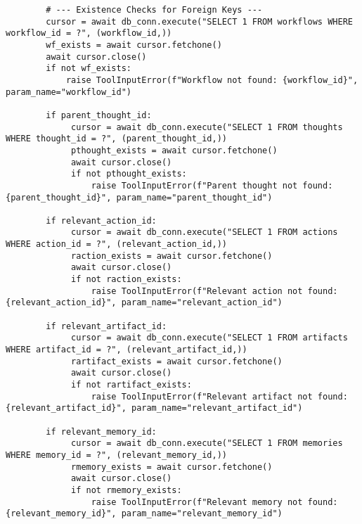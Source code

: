 \documentclass[12pt,a4paper]{article}
\begin{document}
\begin{pageablecode}
\begin{verbatim}
        # --- Existence Checks for Foreign Keys ---
        cursor = await db_conn.execute("SELECT 1 FROM workflows WHERE workflow_id = ?", (workflow_id,))
        wf_exists = await cursor.fetchone()
        await cursor.close()
        if not wf_exists:
            raise ToolInputError(f"Workflow not found: {workflow_id}", param_name="workflow_id")

        if parent_thought_id:
             cursor = await db_conn.execute("SELECT 1 FROM thoughts WHERE thought_id = ?", (parent_thought_id,))
             pthought_exists = await cursor.fetchone()
             await cursor.close()
             if not pthought_exists:
                 raise ToolInputError(f"Parent thought not found: {parent_thought_id}", param_name="parent_thought_id")

        if relevant_action_id:
             cursor = await db_conn.execute("SELECT 1 FROM actions WHERE action_id = ?", (relevant_action_id,))
             raction_exists = await cursor.fetchone()
             await cursor.close()
             if not raction_exists:
                 raise ToolInputError(f"Relevant action not found: {relevant_action_id}", param_name="relevant_action_id")

        if relevant_artifact_id:
             cursor = await db_conn.execute("SELECT 1 FROM artifacts WHERE artifact_id = ?", (relevant_artifact_id,))
             rartifact_exists = await cursor.fetchone()
             await cursor.close()
             if not rartifact_exists:
                 raise ToolInputError(f"Relevant artifact not found: {relevant_artifact_id}", param_name="relevant_artifact_id")

        if relevant_memory_id:
             cursor = await db_conn.execute("SELECT 1 FROM memories WHERE memory_id = ?", (relevant_memory_id,))
             rmemory_exists = await cursor.fetchone()
             await cursor.close()
             if not rmemory_exists:
                 raise ToolInputError(f"Relevant memory not found: {relevant_memory_id}", param_name="relevant_memory_id")


\end{verbatim}
\end{pageablecode}
\end{document}
